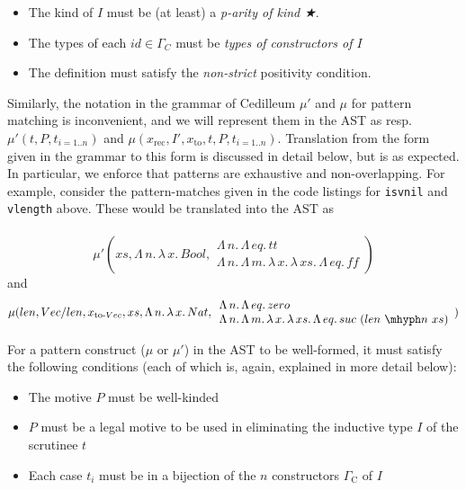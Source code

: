 \documentclass{article}
\newcommand{\absu}[3]{{#1}\, #2.\, #3}
\begin{document}
\begin{itemize}
\item The kind of $I$ must be (at least) a \textit{p-arity of kind ★}.
\item The types of each $id \in \Gamma_C$ must be \textit{types of constructors
    of $I$}
\item The definition must satisfy the \textit{non-strict} positivity condition.
\end{itemize}

Similarly, the notation in the grammar of Cedilleum $\mu'$ and $\mu$ for pattern
matching is inconvenient, and we will represent them in the AST as resp.
$\mu'(t,P,t_{i=1..n})$ and
$\mu(x_{\text{rec}},I',x_{\text{to}},t,P,t_{i=1..n})$. Translation from the form
given in the grammar to this form is discussed in detail below, but is as
expected. In particular, we enforce that patterns are exhaustive and
non-overlapping. For example, consider the pattern-matches given in the code listings
for \texttt{isvnil} and \texttt{vlength} above. These would be translated into
the AST as
\\ \\
\[
  \mu'(xs,\absu{\Lambda}{n}{\absu{\lambda}{x}{Bool}},
  \begin{array}{l}
    \absu{\Lambda}{n}{\absu{\Lambda}{eq}{tt}}
    \\ \absu{\Lambda}{n}{\absu{\Lambda}{m}{\absu{\lambda}{x}{\absu{\lambda}{xs}{\absu{\Lambda}{eq}{ff}}}}}
  \end{array}
  )
\] and
\[ \mu(len, Vec/len, x_{\text{to-}Vec},xs,\absu{\Lambda}{n}{\absu{\lambda}{x}{Nat}},
  \begin{array}{l}
    \absu{\Lambda}{n}{\absu{\Lambda}{eq}{zero}}
    \\ \absu{\Lambda}{n}{\absu{\Lambda}{m}{\absu{\lambda}{x}{\absu{\lambda}{xs}{\absu{\Lambda}{eq}{suc\
    (len\ \mhyph n\ xs)}}}}}
  \end{array})
\]

For a pattern construct ($\mu$ or $\mu'$) in the AST to be well-formed, it must satisfy the
following conditions (each of which is, again, explained in more detail below):

\begin{itemize}
\item The motive $P$ must be well-kinded
\item $P$ must be a legal motive to be used in eliminating the inductive type
  $I$ of the scrutinee $t$
\item Each case $t_i$ must be in a bijection of the $n$ constructors
  $\Gamma_{\text{C}}$ of $I$
\end{itemize}
\end{document}
